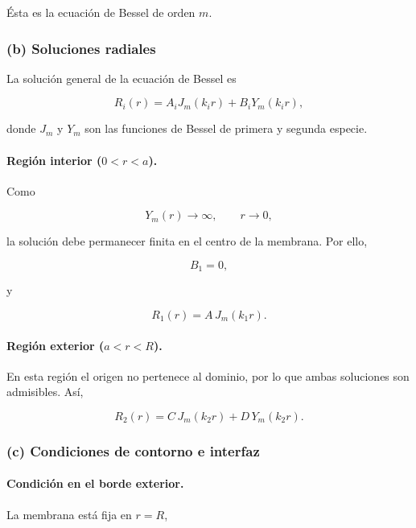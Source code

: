 \documentclass[12pt]{article}
\begin{document}
Ésta es la ecuación de Bessel de orden $m$.

\subsubsection*{(b) Soluciones radiales}

La solución general de la ecuación de Bessel es

\begin{equation}
R_i(r)
=
A_iJ_m(k_ir)
+
B_iY_m(k_ir),
\end{equation}

donde $J_m$ y $Y_m$ son las funciones de Bessel de primera y segunda especie.

\paragraph{Región interior ($0<r<a$).}

Como

\[
Y_m(r)\longrightarrow\infty,
\qquad
r\rightarrow0,
\]

la solución debe permanecer finita en el centro de la membrana. Por ello,

\[
B_1=0,
\]

y

\begin{equation}
\boxed{
R_1(r)=A\,J_m(k_1r).
}
\end{equation}

\paragraph{Región exterior ($a<r<R$).}

En esta región el origen no pertenece al dominio, por lo que ambas soluciones son admisibles. Así,

\begin{equation}
\boxed{
R_2(r)
=
C\,J_m(k_2r)
+
D\,Y_m(k_2r).
}
\end{equation}

\subsubsection*{(c) Condiciones de contorno e interfaz}

\paragraph{Condición en el borde exterior.}

La membrana está fija en $r=R$,
\end{document}
